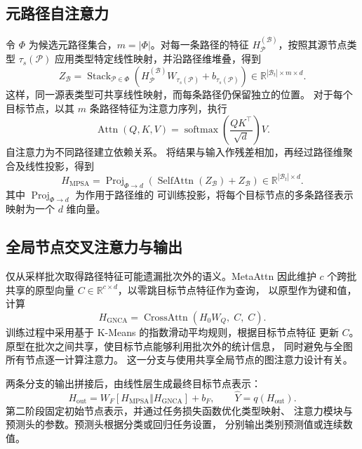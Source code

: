 \subsection{元路径自注意力}

令 $\Phi$ 为候选元路径集合，$m=|\Phi|$。对每一条路径的特征
$H_{\mathcal P}^{(\mathcal B)}$，按照其源节点类型 $\tau_s(\mathcal P)$
应用类型特定线性映射，并沿路径维堆叠，得到
\begin{equation}
  Z_{\mathcal B}
  =\operatorname{Stack}_{\mathcal P\in\Phi}
  \!\left(
    H_{\mathcal P}^{(\mathcal B)}
    W_{\tau_s(\mathcal P)}+b_{\tau_s(\mathcal P)}
  \right)
  \in\mathbb R^{|\mathcal B_t|\times m\times d}.
  \label{eq:metartl-stack}
\end{equation}
这样，同一源表类型可共享线性映射，而每条路径仍保留独立的位置。
对于每个目标节点，以其 $m$ 条路径特征为注意力序列，执行
\begin{equation}
  \operatorname{Attn}(Q,K,V)
  =\operatorname{softmax}\!\left(\frac{QK^\top}{\sqrt d}\right)V.
  \label{eq:metartl-attn}
\end{equation}
自注意力为不同路径建立依赖关系\cite{vaswani2017attention}。
将结果与输入作残差相加，再经过路径维聚合及线性投影，得到
\begin{equation}
  H_{\mathrm{MPSA}}
  =\operatorname{Proj}_{\Phi\rightarrow d}
  \!\left(\operatorname{SelfAttn}(Z_{\mathcal B})+Z_{\mathcal B}\right)
  \in\mathbb R^{|\mathcal B_t|\times d}.
  \label{eq:metartl-mpsa}
\end{equation}
其中 $\operatorname{Proj}_{\Phi\rightarrow d}$ 为作用于路径维的
可训练投影，将每个目标节点的多条路径表示映射为一个 $d$ 维向量。

\subsection{全局节点交叉注意力与输出}

仅从采样批次取得路径特征可能遗漏批次外的语义。MetaAttn 因此维护
$c$ 个跨批共享的原型向量
$C\in\mathbb R^{c\times d}$，以零跳目标节点特征作为查询，
以原型作为键和值，计算
\begin{equation}
  H_{\mathrm{GNCA}}
  =\operatorname{CrossAttn}(H_0W_Q,\;C,\;C).
  \label{eq:metartl-gnca}
\end{equation}
训练过程中采用基于 K-Means 的指数滑动平均规则，根据目标节点特征
更新 $C$。原型在批次之间共享，使目标节点能够利用批次外的统计信息，
同时避免与全图所有节点逐一计算注意力。
这一分支与使用共享全局节点的图注意力设计有关\cite{kong2023goat}。

两条分支的输出拼接后，由线性层生成最终目标节点表示：
\begin{equation}
  H_{\mathrm{out}}
  =W_F[H_{\mathrm{MPSA}}\Vert H_{\mathrm{GNCA}}]+b_F,
  \qquad
  \widehat Y=q(H_{\mathrm{out}}).
  \label{eq:metartl-output}
\end{equation}
第二阶段固定初始节点表示，并通过任务损失函数优化类型映射、
注意力模块与预测头的参数。预测头根据分类或回归任务设置，
分别输出类别预测值或连续数值。


